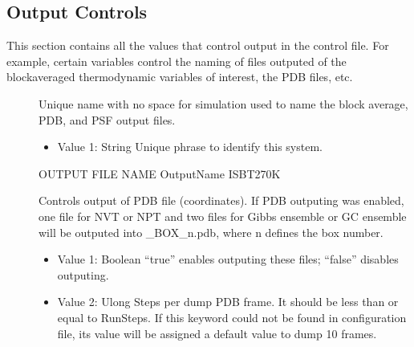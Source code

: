 \documentclass[letterpaper,10pt,english]{sphinxmanual}
\begin{document}
\subsection{Output Controls}
\label{\detokenize{input_file:output-controls}}
This section contains all the values that control output in the control file. For example, certain variables control the naming of files outputed of the block\sphinxhyphen{}averaged thermodynamic variables of interest, the PDB files, etc.
\begin{description}
\item[{}] \leavevmode
Unique name with no space for simulation used to name the block average, PDB, and PSF output files.
\begin{itemize}
\item {} 
Value 1: String \sphinxhyphen{} Unique phrase to identify this system.

\end{itemize}

\begin{sphinxVerbatim}[commandchars=\\\{\}]
\PYGZsh{}\PYGZsh{}\PYGZsh{}\PYGZsh{}\PYGZsh{}\PYGZsh{}\PYGZsh{}\PYGZsh{}\PYGZsh{}\PYGZsh{}\PYGZsh{}\PYGZsh{}\PYGZsh{}\PYGZsh{}\PYGZsh{}\PYGZsh{}\PYGZsh{}\PYGZsh{}\PYGZsh{}\PYGZsh{}\PYGZsh{}\PYGZsh{}\PYGZsh{}\PYGZsh{}\PYGZsh{}\PYGZsh{}\PYGZsh{}\PYGZsh{}\PYGZsh{}\PYGZsh{}\PYGZsh{}\PYGZsh{}\PYGZsh{}
\PYGZsh{} OUTPUT FILE NAME
\PYGZsh{}\PYGZsh{}\PYGZsh{}\PYGZsh{}\PYGZsh{}\PYGZsh{}\PYGZsh{}\PYGZsh{}\PYGZsh{}\PYGZsh{}\PYGZsh{}\PYGZsh{}\PYGZsh{}\PYGZsh{}\PYGZsh{}\PYGZsh{}\PYGZsh{}\PYGZsh{}\PYGZsh{}\PYGZsh{}\PYGZsh{}\PYGZsh{}\PYGZsh{}\PYGZsh{}\PYGZsh{}\PYGZsh{}\PYGZsh{}\PYGZsh{}\PYGZsh{}\PYGZsh{}\PYGZsh{}\PYGZsh{}\PYGZsh{}
OutputName  ISB\PYGZus{}T\PYGZus{}270\PYGZus{}K
\end{sphinxVerbatim}

\item[{}] \leavevmode
Controls output of PDB file (coordinates). If PDB outputing was enabled, one file for NVT or NPT and
two files for Gibbs ensemble or GC ensemble will be outputed into \_BOX\_n.pdb, where n defines the box number.
\begin{itemize}
\item {} 
Value 1: Boolean \sphinxhyphen{} “true” enables outputing these files; “false” disables outputing.

\item {} 
Value 2: Ulong \sphinxhyphen{} Steps per dump PDB frame. It should be less than or equal to RunSteps. If this
keyword could not be found in configuration file, its value will be assigned a default value to dump 10 frames.


\end{itemize}
\end{description}
\end{document}
